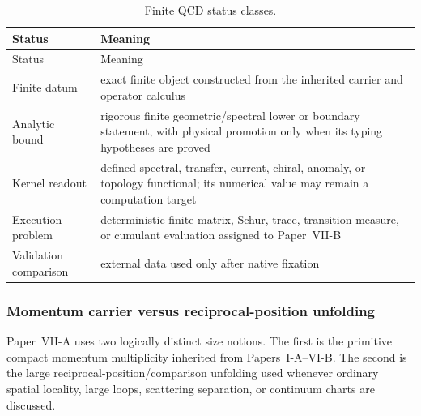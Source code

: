 \documentclass[12pt,a4paper]{article}
\begin{document}
\begin{longtable}{>{\raggedright\arraybackslash}p{} >{\raggedright\arraybackslash}p{}}
\caption[Finite QCD status classes]{Finite QCD status classes.}\label{p10:tab:finite-qcd-status-classes}\\
\toprule
Status & Meaning \\
\midrule
\endfirsthead
\toprule
Status & Meaning \\
\midrule
\endhead
Finite datum & exact finite object constructed from the inherited carrier and operator calculus \\
Analytic bound & rigorous finite geometric/spectral lower or boundary statement, with physical promotion only when its typing hypotheses are proved \\
Kernel readout & defined spectral, transfer, current, chiral, anomaly, or topology functional; its numerical value may remain a computation target \\
Execution problem & deterministic finite matrix, Schur, trace, transition-measure, or cumulant evaluation assigned to Paper~VII-B \\
Validation comparison & external data used only after native fixation \\
\bottomrule
\end{longtable}


\subsubsection{Momentum carrier versus reciprocal-position unfolding}
\label{p10:sec:mp-mx-separation}

Paper~VII-A uses two logically distinct size notions.  The first is the primitive compact momentum multiplicity inherited from Papers~I-A--VI-B.  The second is the large reciprocal-position/comparison unfolding used whenever ordinary spatial locality, large loops, scattering separation, or continuum charts are discussed.
\end{document}
